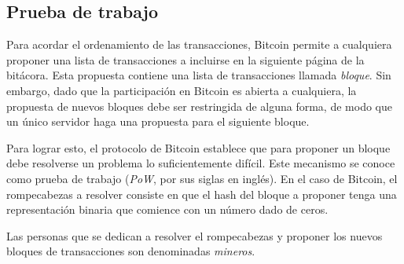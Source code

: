 

 \subsection{Prueba de trabajo}

 Para acordar el ordenamiento de las transacciones, Bitcoin permite a cualquiera proponer una lista
 de transacciones a incluirse en la siguiente página de la bitácora.
 Esta propuesta contiene una lista de transacciones llamada \textit{bloque}.
 Sin embargo, dado que la participación en Bitcoin es abierta a cualquiera, la propuesta de nuevos
 bloques debe ser restringida de alguna forma, de modo que un único servidor haga una propuesta
 para el siguiente bloque.

Para lograr esto, el protocolo de Bitcoin establece que para proponer un bloque debe resolverse
un problema lo suficientemente difícil.
%
Este mecanismo se conoce como prueba de trabajo (\textit{PoW}, por sus siglas en inglés).
%
En el caso de Bitcoin, el rompecabezas a resolver consiste en que el hash del bloque a proponer
tenga una representación binaria que comience con un número dado de ceros.

%
Las personas que se dedican a resolver el rompecabezas y proponer los nuevos bloques de transacciones
son denominadas \textit{mineros}.

